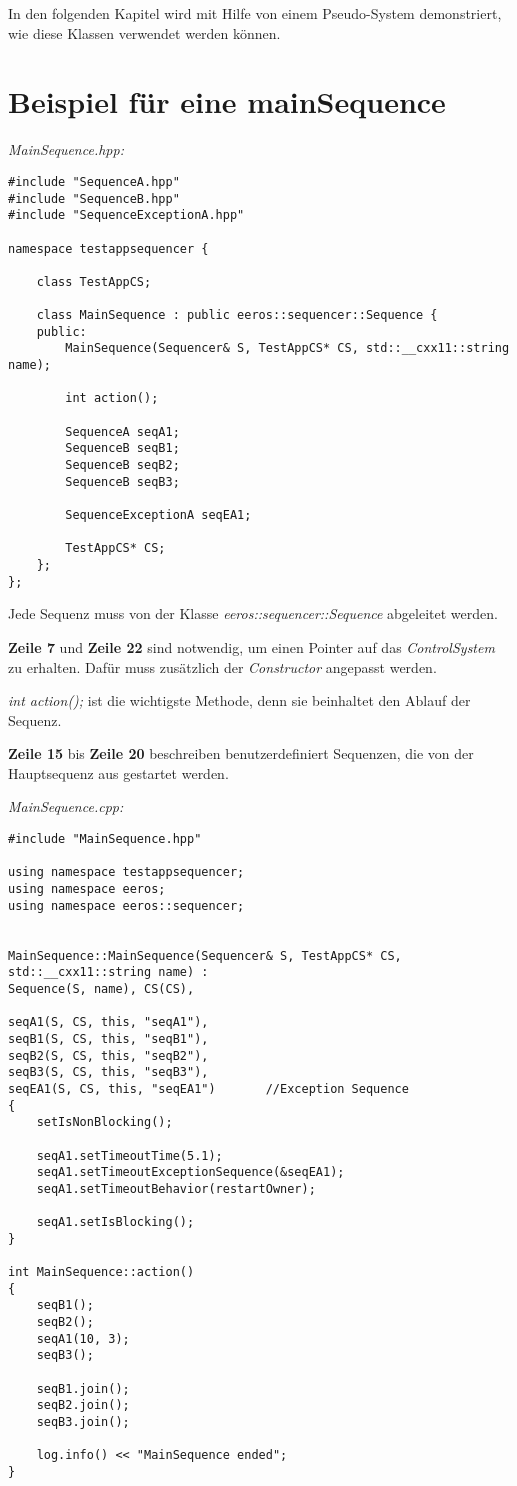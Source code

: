In den folgenden Kapitel wird mit Hilfe von einem Pseudo-System demonstriert, wie diese Klassen verwendet werden können.

\section{Beispiel für eine mainSequence}

\textit{MainSequence.hpp:}\
\begin{lstlisting}
#include "SequenceA.hpp"
#include "SequenceB.hpp"
#include "SequenceExceptionA.hpp"

namespace testappsequencer {

	class TestAppCS;
	
	class MainSequence : public eeros::sequencer::Sequence {
	public:
		MainSequence(Sequencer& S, TestAppCS* CS, std::__cxx11::string name);

		int action();
		
		SequenceA seqA1;
		SequenceB seqB1; 
		SequenceB seqB2; 
		SequenceB seqB3;
		
		SequenceExceptionA seqEA1;
		
		TestAppCS* CS;
	};
};
\end{lstlisting}

Jede Sequenz muss von der Klasse \textit{eeros::sequencer::Sequence} abgeleitet werden.

\textbf{Zeile 7} und \textbf{Zeile 22} sind notwendig, um einen Pointer auf das \textit{ControlSystem} zu erhalten.
Dafür muss zusätzlich der \textit{Constructor} angepasst werden.

\textit{int action();} ist die wichtigste Methode, denn sie beinhaltet den Ablauf der Sequenz.

\textbf{Zeile 15} bis \textbf{Zeile 20} beschreiben benutzerdefiniert Sequenzen, die von der Hauptsequenz aus gestartet werden.


\textit{MainSequence.cpp:}\
\begin{lstlisting}
#include "MainSequence.hpp"

using namespace testappsequencer;
using namespace eeros;
using namespace eeros::sequencer;


MainSequence::MainSequence(Sequencer& S, TestAppCS* CS, std::__cxx11::string name) :
Sequence(S, name), CS(CS),

seqA1(S, CS, this, "seqA1"),
seqB1(S, CS, this, "seqB1"),
seqB2(S, CS, this, "seqB2"),
seqB3(S, CS, this, "seqB3"),
seqEA1(S, CS, this, "seqEA1")		//Exception Sequence
{
	setIsNonBlocking();
	
	seqA1.setTimeoutTime(5.1);
	seqA1.setTimeoutExceptionSequence(&seqEA1);
	seqA1.setTimeoutBehavior(restartOwner);
	
	seqA1.setIsBlocking();
}

int MainSequence::action()
{
	seqB1();
	seqB2();
	seqA1(10, 3);
	seqB3();
	
	seqB1.join();
	seqB2.join();
	seqB3.join();
	
	log.info() << "MainSequence ended";
}
\end{lstlisting}

